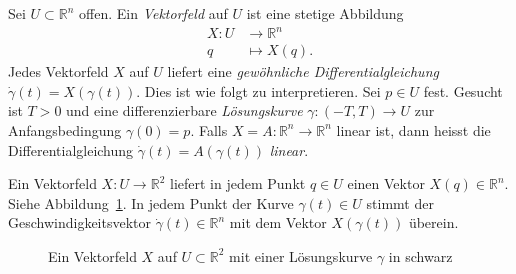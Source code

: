 \documentclass[../main.tex]{subfiles}
\begin{document}
\begin{definition}
  Sei $U \subset \mathbb{R}^n$ offen.
  Ein \emph{Vektorfeld} auf $U$ ist eine stetige Abbildung
  \begin{align*}
    X \colon U & \to \mathbb{R}^n \\
    q & \mapsto X(q).
  \end{align*}
  Jedes Vektorfeld $X$ auf $U$ liefert eine
  \emph{gewöhnliche Differentialgleichung}
  $\dot \gamma(t) = X(\gamma(t))$.
  Dies ist wie folgt zu interpretieren.
  Sei $p \in U$ fest. Gesucht ist $T > 0$ 
  und eine differenzierbare  \emph{Lösungskurve}
  $\gamma  \colon (-T, T) \to U$ 
  zur Anfangsbedingung $\gamma(0) = p$.
  Falls $X = A \colon \mathbb{R}^n \to \mathbb{R}^n$ 
  linear ist, dann heisst die Differentialgleichung
  $\dot \gamma(t) = A(\gamma(t))$
  \emph{linear}.
\end{definition}

\begin{geometric}
  Ein Vektorfeld $X \colon U \to \mathbb{R}^2$ 
  liefert in jedem Punkt $q \in U$ einen Vektor
  $X(q) \in \mathbb{R}^n$.
  Siehe Abbildung~\ref{fig:vectorfield}.
  In jedem Punkt der Kurve
  $\gamma(t) \in U$ stimmt der Geschwindigkeitsvektor
  $\dot \gamma(t) \in \mathbb{R}^n$ 
  mit dem Vektor $X(\gamma(t))$ überein.
\end{geometric}

\begin{figure}[ht]
    \centering
    \caption{Ein Vektorfeld $X$ auf $U \subset \mathbb{R}^2$
    mit einer Lösungskurve $\gamma$ in schwarz}%
    \label{fig:vectorfield}
\end{figure}
\end{document}
